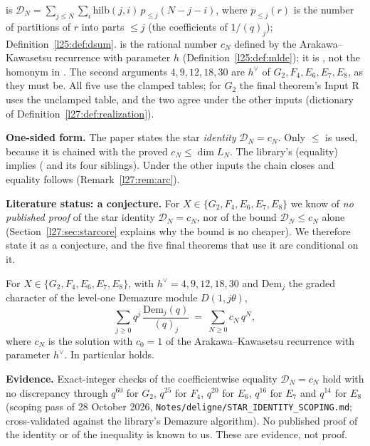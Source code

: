 \begin{dictionary}
 is $\mathcal D_N=\sum_{j\le N}\sum_i\mathrm{hilb}(j,i)\,p_{\le j}(N-j-i)$, where $p_{\le j}(r)$ is the
number of partitions of $r$ into parts $\le j$ (the coefficients of $1/(q)_j$); Definition~\ref{l25:def:dsum}. 
is the rational number $c_N$ defined by the Arakawa--Kawasetsu recurrence with parameter $h$ (Definition~\ref{l25:def:mlde}); it is
, not the homonym in . The second arguments
$4,9,12,18,30$ are $h^\vee$ of $G_2,F_4,E_6,E_7,E_8$, as they must be. All five use the clamped tables; for $G_2$ the final theorem's
Input R uses the unclamped table, and the two agree under the other inputs (dictionary of Definition~\ref{l27:def:realization}).

\textbf{One-sided form.} The paper states the star \emph{identity} $\mathcal D_N=c_N$. Only $\le$ is used, because it is chained with
the proved $c_N\le\dim L_N$. The library's  (equality) implies  (
and its four siblings). Under the other inputs the chain closes and equality follows (Remark~\ref{l27:rem:arc}).
\end{dictionary}

\textbf{Literature status: a conjecture.} For $X\in\{G_2,F_4,E_6,E_7,E_8\}$ we know of \emph{no published proof} of the star
identity $\mathcal D_N=c_N$, nor of the bound $\mathcal D_N\le c_N$ alone (Section~\ref{l27:sec:starcore} explains why the bound
is no cheaper). We therefore state it as a conjecture, and the five final theorems that use it are conditional on it.

\begin{conjecture}\label{l27:conj:star}
For $X\in\{G_2,F_4,E_6,E_7,E_8\}$, with $h^\vee=4,9,12,18,30$ and $\mathrm{Dem}_j$ the graded character of the level-one Demazure
module $D(1,j\theta)$,
\begin{equation*}
\sum_{j\ge0}q^j\,\frac{\mathrm{Dem}_j(q)}{(q)_j}\ =\ \sum_{N\ge0}c_N\,q^N ,
\end{equation*}
where $c_N$ is the solution with $c_0=1$ of the Arakawa--Kawasetsu recurrence with parameter $h^\vee$. In particular
 holds.
\end{conjecture}

\textbf{Evidence.} Exact-integer checks of the coefficientwise equality $\mathcal D_N=c_N$ hold with no discrepancy through $q^{60}$ for $G_2$, $q^{25}$ for $F_4$, $q^{20}$ for $E_6$, $q^{16}$ for $E_7$ and $q^{14}$ for $E_8$ (scoping pass of 28 October 2026, \texttt{Notes/deligne/STAR\_IDENTITY\_SCOPING.md}; cross-validated against the library's Demazure algorithm). No published proof of the identity or of the inequality is known to us. These are evidence, not proof.


